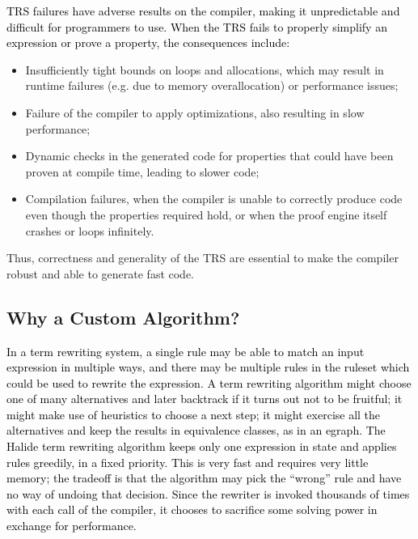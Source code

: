 \documentclass[acmsmall]{acmart}\settopmatter{}
\newcommand{\modified}[1]{\textcolor{black}{{#1}}}
\begin{document}
\modified{TRS failures have adverse results on the compiler, making it unpredictable and
  difficult for programmers to use.  When the TRS fails to properly simplify an expression or
  prove a property, the consequences include: }
\begin{itemize}
\item Insufficiently tight bounds on loops and allocations, which may result in
  runtime failures (e.g. due to memory overallocation) or performance issues;

\item Failure of the compiler to apply optimizations, also resulting in slow performance;

\item Dynamic checks in the generated code for properties that could have been proven
  at compile time, leading to slower code;

\item Compilation failures, when the compiler is unable to correctly produce code
  even though the properties required hold, or when the proof engine itself crashes
  or loops infinitely.
\end{itemize}

Thus, correctness and generality of the TRS are essential to make the compiler
robust and able to generate fast code.

\subsection{Why a Custom Algorithm?}
\label{sec:whycustom}

\modified{In a term rewriting system, a single rule may be able to match an input expression in 
multiple ways, and there may be multiple rules in the ruleset which could be used 
to rewrite the expression. A term rewriting algorithm might choose one of many alternatives 
and later backtrack if it turns out not to be fruitful; it might make use of 
heuristics to choose a next step; it might exercise all the alternatives and keep 
the results in equivalence classes, as in an egraph. The Halide term rewriting algorithm
keeps only one expression in state and applies rules greedily, in a fixed priority.
This is very fast and requires very little memory; the tradeoff is that the algorithm 
may pick the ``wrong'' rule and have no way of undoing that decision. 
Since the rewriter is invoked thousands of times with each call of the compiler, 
it chooses to sacrifice some solving power in exchange for performance.}
\end{document}
